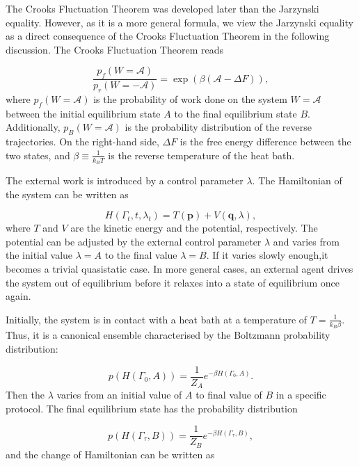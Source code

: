 \documentclass[ reprint, amsmath,amssymb, aps,]{revtex4-1}
\begin{document}
The Crooks Fluctuation Theorem was developed later than the Jarzynski equality. However, as it is a more general formula, we view the Jarzynski equality as a direct consequence of the Crooks Fluctuation Theorem in the following discussion. The Crooks Fluctuation Theorem reads

\begin{equation}
\frac{p_f(W=\mathcal{A})}{p_r(W=-\mathcal{A})}=\exp\left(\beta(\mathcal{A}-\Delta F)\right),
\end{equation}
where $p_f(W=\mathcal{A})$ is the probability of work done on the system $W=\mathcal{A}$ between the initial equilibrium state $A$ to the final equilibrium state $B$. Additionally, $p_B(W=\mathcal{A})$ is the probability distribution of the reverse trajectories. On the right-hand side, $\Delta F$ is the free energy difference between the two states, and $\beta\equiv\frac{1}{k_BT} $ is the reverse temperature of the heat bath.


The external work is introduced by a control parameter $\lambda$. The Hamiltonian of the system can be written as

\begin{equation}
H(\Gamma_t,t,\lambda_t)=T(\mathbf{p})+V(\mathbf{q},\lambda),
\end{equation}
where $T$ and $V$ are the kinetic energy and the potential, respectively. The potential can be adjusted by the external control parameter $\lambda$ and varies from the initial value $\lambda=A$ to the final value $\lambda=B$. If it varies slowly enough,it becomes a trivial quasistatic case. In more general cases, an external agent drives the system out of equilibrium before it relaxes into a state of equilibrium once again.%


Initially, the system is in contact with a heat bath at a temperature of $T=\frac{1}{k_B\beta}$. Thus, it is a canonical ensemble characterised by the Boltzmann probability distribution:

\begin{equation}
p(H(\Gamma_0,A))=\frac{1}{Z_A}e^{-\beta H(\Gamma_0,A)}.
\end{equation}
Then the $\lambda$ varies from an initial value of $A$ to final value of $B$ in a specific protocol. The final equilibrium state has the probability distribution

\begin{equation}
p(H(\Gamma_\tau,B))=\frac{1}{Z_B}e^{-\beta H(\Gamma_\tau,B)},
\end{equation}
and the change of Hamiltonian can be written as
\end{document}
